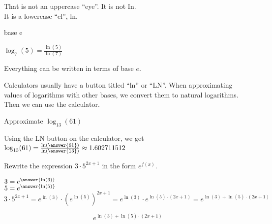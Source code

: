 \documentclass{ximera}
\begin{document}
\begin{warning}
That is not an uppercase ``eye''.  It is not In.  \\

It is a lowercase ``el'', ln.
\end{warning}




\begin{example}  base e


$\log_7(5) = \frac{\ln(5)}{\ln(7)}$


\end{example}
Everything can be written in terms of base $e$.


Calculators usually have a button titled ``ln'' or ``LN''.  When approximating values of logarithms with other bases, we convert them to natural logarithms.  Then we can use the calculator.









\begin{example}  


Approximate $\log_{13}(61)$


\begin{explanation}


Using the LN button on the calculator, we get $\log_{13}(61) = \frac{\ln\left(\answer{61}\right)}{\ln\left(\answer{13}\right)} \approx 1.602711512$
\end{explanation}
\end{example}








\begin{example}  


Rewrite the expression $3 \cdot 5^{2x + 1}$ in the form $e^{f(x)}$.


\begin{explanation}


$3 = e^{\answer{\ln(3)}}$ \\


$5 = e^{\answer{\ln(5)}}$ \\


\[   3 \cdot 5^{2x + 1} = e^{\ln(3)} \cdot (e^{\ln(5)})^{2x + 1}  =  e^{\ln(3)} \cdot e^{\ln(5) \cdot (2x + 1)}  = e^{\ln(3) + \ln(5) \cdot (2x + 1)} \]


\[  e^{\ln(3) + \ln(5) \cdot (2x + 1)} \] 

\end{explanation}
\end{example}
\end{document}
